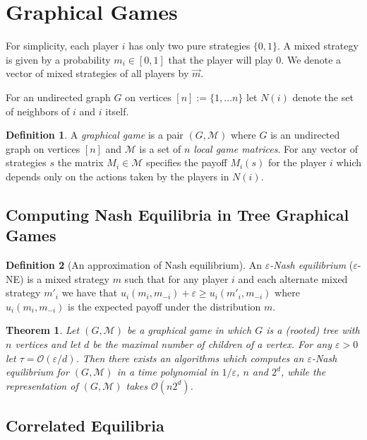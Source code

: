 \documentclass{article}
\newtheorem{theorem}{Theorem}
\theoremstyle{definition}
\newtheorem*{definition}{Definition}
\newcommand{\calM}{\mathcal{M}}
\newcommand{\calO}{\mathcal{O}}
\begin{document}
\section{Graphical Games}
For simplicity, each player $i$ has only two pure strategies $\{0, 1\}$.
A mixed strategy is given by a probability $m_i \in [0, 1]$ that the player will play 0.
We denote a vector of mixed strategies of all players by $\vec{m}$.

For an undirected graph $G$ on vertices $[n] := \{1, \dots n\}$ let $N(i)$ denote the
set of neighbors of $i$ and $i$ itself.

\begin{definition} A \textit{graphical game} is a pair $(G, \calM)$ where $G$ is an undirected graph on
vertices $[n]$ and $\calM$ is a set of $n$ \textit{local game matrices}.
For any vector of strategies $s$ the matrix $M_i \in \calM$ specifies the payoff $M_i(s)$
for the player $i$ which depends only on the actions taken by the players in $N(i)$.
\end{definition}

\subsection{Computing Nash Equilibria in Tree Graphical Games}
\begin{definition}[An approximation of Nash equilibrium] An \textit{$\varepsilon$-Nash equilibrium} ($\varepsilon$-NE) is a mixed
strategy $m$ such that for any player $i$ and each alternate mixed strategy $m'_i$
we have that $u_i(m_i,m_{-i}) + \varepsilon\ge u_i(m'_i,m_{-i})$ where $u_i(m_i,m_{-i})$ is
the expected payoff under the distribution $m$.
\end{definition}

\begin{theorem}
Let $(G, \calM)$ be a graphical game in which $G$ is a (rooted) tree with $n$ vertices
and let $d$ be the maximal number of children of a vertex. For any $\varepsilon > 0$
let $\tau = \calO(\varepsilon/d)$. Then there exists an algorithms which computes
an $\varepsilon$-Nash equilibrium for $(G, \calM)$ in a time polynomial
in $1/\varepsilon$, $n$ and $2^d$, while the representation of $(G, \calM)$ takes
$\calO(n2^d)$.
\end{theorem}

\subsection{Correlated Equilibria}
\end{document}
